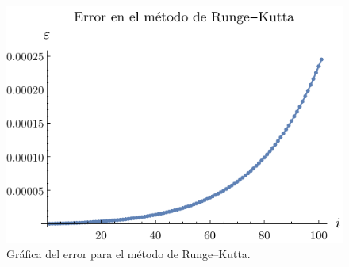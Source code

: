 \documentclass[
    english, spanish, Ce-table, Ce-theorem
]{CabesHW}
\begin{document}
\begin{figure}[H]
    \centering
    \includegraphics{imgs/plot-runge_kutta.pdf}
    \caption{Gráfica del error para el método de Runge--Kutta.}
    \label{fig:runge_kutta}
\end{figure}
\end{document}
